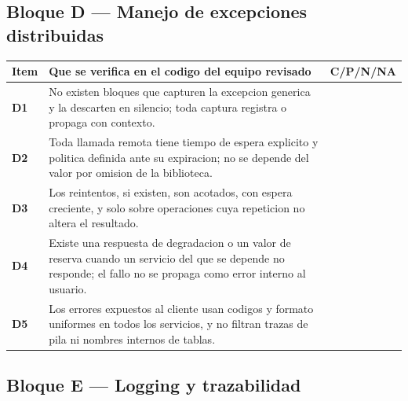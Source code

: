 \documentclass[11pt,a4paper]{article}
\begin{document}
\subsection{Bloque D --- Manejo de excepciones distribuidas}

\noindent
\begin{tabularx}{\linewidth}{@{}>{\bfseries}p{0.9cm} X >{\centering\arraybackslash}p{2.4cm}@{}}
    \toprule
    \rowcolor{uteqSoft}\textbf{\color{uteqBlue}Item} & \textbf{\color{uteqBlue}Que se verifica en el codigo del equipo revisado} & \textbf{\color{uteqBlue}C/P/N/NA} \\
    \midrule
    D1 & No existen bloques que capturen la excepcion generica y la descarten en silencio; toda captura registra o propaga con contexto. & \\
    D2 & Toda llamada remota tiene tiempo de espera explicito y politica definida ante su expiracion; no se depende del valor por omision de la biblioteca. & \\
    D3 & Los reintentos, si existen, son acotados, con espera creciente, y solo sobre operaciones cuya repeticion no altera el resultado. & \\
    D4 & Existe una respuesta de degradacion o un valor de reserva cuando un servicio del que se depende no responde; el fallo no se propaga como error interno al usuario. & \\
    D5 & Los errores expuestos al cliente usan codigos y formato uniformes en todos los servicios, y no filtran trazas de pila ni nombres internos de tablas. & \\
    \bottomrule
\end{tabularx}

\subsection{Bloque E --- Logging y trazabilidad}
\end{document}
